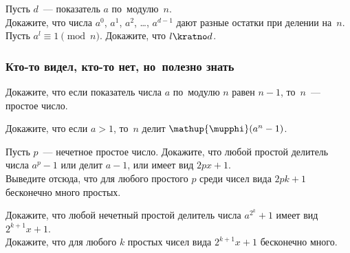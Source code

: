 


\begingroup
    \ifdefined\mathup
        \providecommand\eulerphi{\mathup{\mupphi}}\fi
    \ifdefined\upphi
        \providecommand\eulerphi{\upphi}\fi
    \providecommand\eulerphi{\phi}%

\begin{problems}

\item{}
Пусть $d$~--- показатель $a$ по~модулю~$n$.
\\
\subproblem
Докажите, что числа $a^0$, $a^1$, $a^2$, \ldots, $a^{d-1}$ дают разные остатки
при делении на~$n$.
\\
\subproblem
Пусть $a^l \equiv 1 \pmod{n}$.
Докажите, что $l \kratno d$.

\end{problems}

\subsubsection*{Кто-то видел, кто-то нет, но~полезно знать}

\begin{problems}

\item
Докажите, что если показатель числа $a$ по~модулю $n$ равен $n - 1$, то~$n$~---
простое число.

\item
Докажите, что если $a > 1$, то~$n$ делит $\eulerphi(a^{n} - 1)$.

\item
\subproblem
Пусть $p$~--- нечетное простое число.
Докажите, что любой простой делитель числа $a^{p} - 1$ или делит $a - 1$, или
имеет вид $2 p x + 1$.
\\
\subproblem
Выведите отсюда, что для любого простого $p$ среди чисел вида $2 p k + 1$
бесконечно много простых.

\item
\subproblem
Докажите, что любой нечетный простой делитель числа $a^{2^{k}} + 1$ имеет вид
$2^{k+1} x + 1$.
\\
\subproblem
Докажите, что для любого $k$ простых чисел вида $2^{k+1} x + 1$ бесконечно
много.

\end{problems}

